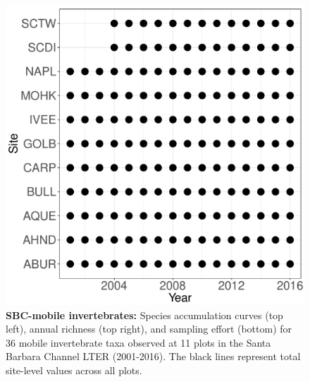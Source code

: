 \documentclass[11pt, oneside]{article}
\begin{document}
\begin{figure}[h!]
\includegraphics[scale = 0.4]{sbc-mobileInverts-castorani_spatiotemporal_sampling_effort.pdf}
\caption{{\bf SBC-mobile invertebrates:} Species accumulation curves (top left),  annual richness (top right), and sampling effort (bottom)  for 36 mobile invertebrate taxa observed at 11 plots in the Santa Barbara Channel LTER (2001-2016). The black lines represent total site-level values across all plots.}
\label{sbc-mobileInverts}
\end{figure}
\end{document}
